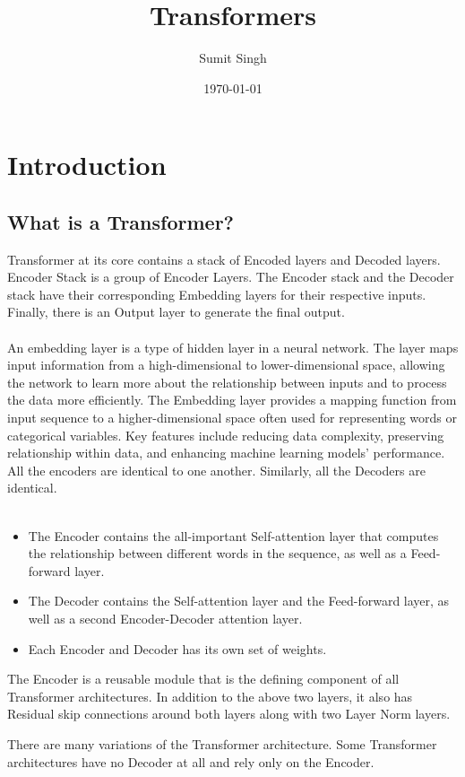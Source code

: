 \documentclass{article}
\title{Transformers}
\author{Sumit Singh}
\date{\today}
\begin{document}
\maketitle

\section{Introduction}
\subsection{What is a Transformer?}
Transformer at its core contains a stack of Encoded layers and Decoded layers. Encoder Stack is a group of Encoder Layers. The Encoder stack and the Decoder stack have their corresponding Embedding layers for their respective inputs. Finally, there is an Output layer to generate the final output. \\
 \\
An embedding layer is a type of hidden layer in a neural network. The layer maps input information from a high-dimensional to lower-dimensional space, allowing the network to learn more about the relationship between inputs and to process the data more efficiently. The Embedding layer provides a mapping function from input sequence to a higher-dimensional space often used for representing words or categorical variables. Key features include reducing data complexity, preserving relationship within data, and enhancing machine learning models' performance. \\
All the encoders are identical to one another. Similarly, all the Decoders are identical. \\
 
%
\\
\begin{itemize}
    \item The Encoder contains the all-important Self-attention layer that computes the relationship between different words in the sequence, as well as a Feed-forward layer.
    \item The Decoder contains the Self-attention layer and the Feed-forward layer, as well as a second Encoder-Decoder attention layer.
    \item Each Encoder and Decoder has its own set of weights.
\end{itemize}
The Encoder is a reusable module that is the defining component of all Transformer architectures. In addition to the above two layers, it also has Residual skip connections around both layers along with two Layer Norm layers.

There are many variations of the Transformer architecture. Some Transformer architectures have no Decoder at all and rely only on the Encoder.
\end{document}
